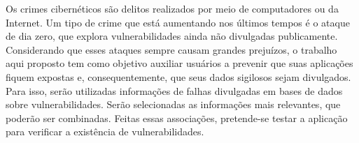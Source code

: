 \begin{resumo}
Os crimes cibernéticos são delitos realizados por meio de computadores ou da Internet. Um tipo de crime que está aumentando nos últimos tempos é o ataque de dia zero, que explora vulnerabilidades ainda não divulgadas publicamente. Considerando que esses ataques sempre causam grandes prejuízos, o trabalho aqui proposto tem como objetivo auxiliar usuários a prevenir que suas aplicações fiquem expostas e, consequentemente, que seus dados sigilosos sejam divulgados. Para isso, serão utilizadas informações de falhas divulgadas em bases de dados sobre vulnerabilidades. Serão selecionadas as informações mais relevantes, que poderão ser combinadas. Feitas essas associações, pretende-se testar a aplicação para verificar a existência de vulnerabilidades. 
\end{resumo}
